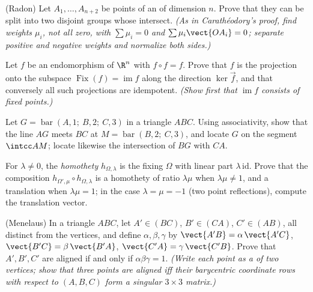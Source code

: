 \begin{exercise}[$\star\star\star$]\label{exo:b2:affine:7}
(Radon) Let $A_1, \dots, A_{n+2}$ be points of an  of
dimension $n$. Prove that they can be split into two disjoint
groups whose  intersect. \emph{(As in Carathéodory's
proof, find weights $\mu_i$, not all zero, with $\sum\mu_i = 0$ and
$\sum\mu_i\vect{OA_i} = 0$; separate positive and negative weights
and normalize both sides.)}
\end{exercise}

\begin{exercise}[$\star\star\star$]\label{exo:b2:affine:8}
Let $f$ be an  endomorphism of $\R^n$ with $f \circ f = f$.
Prove that $f$ is the  projection onto the  subspace
$\operatorname{Fix}(f) = \operatorname{im} f$ along the direction
$\ker\vec f$, and that conversely all such projections are
idempotent. \emph{(Show first that $\operatorname{im} f$ consists
of fixed points.)}
\end{exercise}

\begin{exercise}[$\star$]\label{exo:b2:affine:9}
Let $G = \operatorname{bar}(A, 1;\ B, 2;\ C, 3)$ in a triangle
$ABC$. Using associativity, show that the line $AG$ meets $BC$
at $M = \operatorname{bar}(B, 2;\ C, 3)$, and locate $G$ on the
segment $\intcc AM$; locate likewise the intersection of $BG$
with $CA$.
\end{exercise}

\begin{exercise}[$\star\star$]\label{exo:b2:affine:10}
For $\lambda \neq 0$, the \emph{homothety} $h_{\Omega,
\lambda}$ is the  fixing $\Omega$ with linear part
$\lambda\,\mathrm{id}$. Prove that the composition
$h_{\Omega', \mu} \circ h_{\Omega, \lambda}$ is a homothety of
ratio $\lambda\mu$ when $\lambda\mu \neq 1$, and a translation
when $\lambda\mu = 1$; in the case $\lambda = \mu = -1$ (two
point reflections), compute the translation vector.
\end{exercise}

\begin{exercise}[$\star\star$]\label{exo:b2:affine:11}
(Menelaus) In a triangle $ABC$, let $A' \in (BC)$, $B' \in
(CA)$, $C' \in (AB)$, all distinct from the vertices, and
define $\alpha, \beta, \gamma$ by $\vect{A'B} =
\alpha\,\vect{A'C}$, $\vect{B'C} = \beta\,\vect{B'A}$,
$\vect{C'A} = \gamma\,\vect{C'B}$. Prove that $A', B', C'$ are
aligned if and only if $\alpha\beta\gamma = 1$. \emph{(Write
each point as a  of two vertices; show that three
points are aligned iff their barycentric coordinate rows with
respect to $(A, B, C)$ form a singular $3 \times 3$ matrix.)}
\end{exercise}

